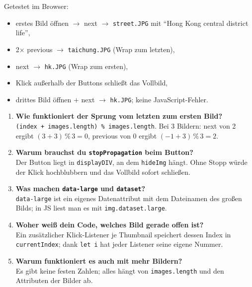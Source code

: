 \documentclass[a4paper,11pt]{article}
\begin{document}
\begin{ergebnis}
Getestet im Browser:
\begin{itemize}[nosep]
\item erstes Bild öffnen $\to$ next $\to$ \texttt{street.JPG} mit "`Hong Kong central district life"',
\item 2$\times$ previous $\to$ \texttt{taichung.JPG} (Wrap zum letzten),
\item next $\to$ \texttt{hk.JPG} (Wrap zum ersten),
\item Klick außerhalb der Buttons schließt das Vollbild,
\item drittes Bild öffnen $+$ next $\to$ \texttt{hk.JPG}; keine JavaScript-Fehler.
\end{itemize}
\end{ergebnis}

\begin{tutor}
\begin{enumerate}[leftmargin=*]
\item \textbf{Wie funktioniert der Sprung vom letzten zum ersten Bild?}\\
  \lstinline|(index + images.length) % images.length|. Bei 3 Bildern: next von 2 ergibt $(3+3)\,\%\,3 = 0$,
  previous von 0 ergibt $(-1+3)\,\%\,3 = 2$.
\item \textbf{Warum brauchst du \texttt{stopPropagation} beim Button?}\\
  Der Button liegt in \texttt{displayDIV}, an dem \texttt{hideImg} hängt. Ohne Stopp würde der Klick hochblubbern
  und das Vollbild sofort schließen.
\item \textbf{Was machen \texttt{data-large} und \texttt{dataset}?}\\
  \texttt{data-large} ist ein eigenes Datenattribut mit dem Dateinamen des großen Bilds; in JS liest man es mit
  \lstinline|img.dataset.large|.
\item \textbf{Woher weiß dein Code, welches Bild gerade offen ist?}\\
  Ein zusätzlicher Klick-Listener je Thumbnail speichert dessen Index in \texttt{currentIndex}; dank \texttt{let i}
  hat jeder Listener seine eigene Nummer.
\item \textbf{Warum funktioniert es auch mit mehr Bildern?}\\
  Es gibt keine festen Zahlen; alles hängt von \texttt{images.length} und den Attributen der Bilder ab.
\end{enumerate}
\end{tutor}

\end{document}
